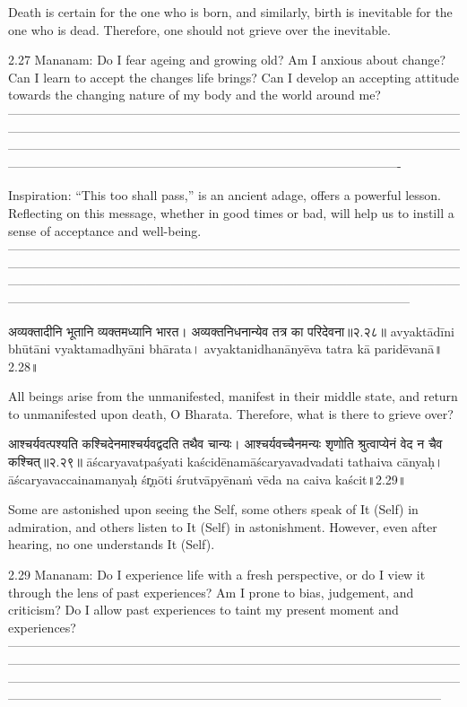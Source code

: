 Death is certain for the one who is born, and similarly, birth is inevitable for the one who is dead. Therefore, one should not grieve over the inevitable. 

2.27 Mananam:
Do I fear ageing and growing old? Am I anxious about change? Can I learn to accept the changes life brings? Can I develop an accepting attitude towards the changing nature of my body and the world around me?
—-------------------------------------------------------------------------------------------------------------------------------------------------------------------------------------------------------------------------------------------------------------------------------------------------------------------------------------------------------------------------------------------------------------------------------

Inspiration:
“This too shall pass,” is an ancient adage, offers a powerful lesson. Reflecting on this message, whether in good times or bad, will help us to instill a sense of acceptance and well-being.
—---------------------------------------------------------------------------------------------------------------------------------------------------------------------------------------------------------------------------------------------------------------------------------------------------------------------------------------------------------------------------------------------------------------------------------



अव्यक्तादीनि भूतानि व्यक्तमध्यानि भारत।
 अव्यक्तनिधनान्येव तत्र का परिदेवना॥२.२८॥
avyaktādīni bhūtāni vyaktamadhyāni bhārata।
avyaktanidhanānyēva tatra kā paridēvanā॥2.28॥

All beings arise from the unmanifested, manifest in their middle state, and return to unmanifested upon death, O Bharata. Therefore, what is there to grieve over?


आश्चर्यवत्पश्यति कश्चिदेनमाश्चर्यवद्वदति तथैव चान्यः। 
आश्चर्यवच्चैनमन्यः शृणोति श्रुत्वाप्येनं वेद न चैव कश्चित्॥२.२९॥
āścaryavatpaśyati kaścidēnamāścaryavadvadati tathaiva cānyaḥ। 
āścaryavaccainamanyaḥ śr̥ṇōti śrutvāpyēnaṁ vēda na caiva kaścit॥2.29॥

Some are astonished upon seeing the Self, some others speak of It (Self) in admiration, and others listen to It (Self) in astonishment.  However, even after hearing, no one understands It (Self).

2.29 Mananam:
Do I experience life with a fresh perspective, or do I view it through the lens of past experiences? Am I prone to bias, judgement, and criticism? Do I allow past experiences to taint my present moment and experiences?
—-----------------------------------------------------------------------------------------------------------------------------------------------------------------------------------------------------------------------------------------------------------------------------------------------------------------------------------------------------------------------------------------------------------------------------------------
 
